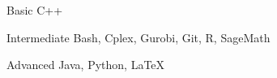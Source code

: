 

\begin{cvskills}

  \cvskill
    {Basic} %
    {C++} %

  \cvskill
    {Intermediate} %
    {Bash, Cplex, Gurobi, Git, R, SageMath} %

  \cvskill
    {Advanced} %
    {Java, Python, \LaTeX} %

\end{cvskills}
